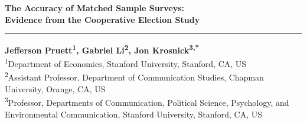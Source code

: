 \documentclass[12pt]{article}
\newcommand{\HRule}{\noindent\rule{\linewidth}{0.5pt}}
\begin{document}
\begin{titlepage}
\thispagestyle{titlepage}

\begin{center}
  \textbf{\Large The Accuracy of Matched Sample Surveys:}\\[0em]
  \textbf{\Large Evidence from the Cooperative Election Study}
\end{center}

\vspace{-1.2em}
\HRule
\vspace{1.2em}

\begin{flushleft}
  {\bfseries
    Jefferson Pruett\textsuperscript{1},
    Gabriel Li\textsuperscript{2},
    Jon Krosnick\textsuperscript{3,*}
  }\\[0.8em]

  {\footnotesize
    \textsuperscript{1}Department of Economics, Stanford University, Stanford, CA, US\\
    \textsuperscript{2}Assistant Professor, Department of Communication Studies, Chapman University, Orange, CA, US\\
    \textsuperscript{3}Professor, Departments of Communication, Political Science, Psychology, and Environmental Communication, Stanford University, Stanford, CA, US
  }
\end{flushleft}

\vfill

\end{titlepage}


\setcounter{page}{1}
\pagestyle{fancy}
\end{document}
